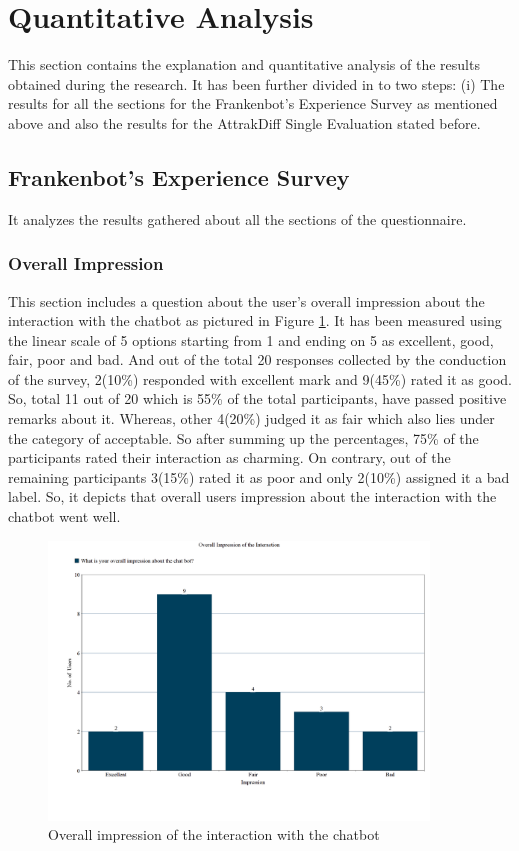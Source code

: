 \section{Quantitative Analysis}
This section contains the explanation and quantitative analysis of the results obtained during the research. It has been further divided in to two steps: (i) The results for all the sections for the Frankenbot's Experience Survey as mentioned above and also the results for the AttrakDiff Single Evaluation stated before. 

\subsection{Frankenbot's Experience Survey}
It analyzes the results gathered about all the sections of the questionnaire.

\subsubsection*{Overall Impression}
This section includes a question about the user's overall impression about the interaction with the chatbot as pictured in Figure \ref{fig:overallImpre}. It has been measured using the linear scale of 5 options starting from 1 and ending on 5 as excellent, good, fair, poor and bad. And out of the total 20 responses collected by the conduction of the survey, 2(10\%) responded with excellent mark and 9(45\%) rated it as good. So, total 11 out of 20 which is 55\% of the total participants, have passed positive remarks about it. Whereas, other 4(20\%) judged it as fair which also lies under the category of acceptable. So after summing up the percentages, 75\% of the participants rated their interaction as charming. On contrary, out of the remaining participants 3(15\%) rated it as poor and only 2(10\%) assigned it a bad label. So, it depicts that overall users impression about the interaction with the chatbot went well.

\begin{figure}[!h]
    \centering
    \includegraphics[width=0.9\textwidth]{img/Overall_Impression_Updated.PNG}
    \caption{Overall impression of the interaction with the chatbot}
    \label{fig:overallImpre}
\end{figure}

